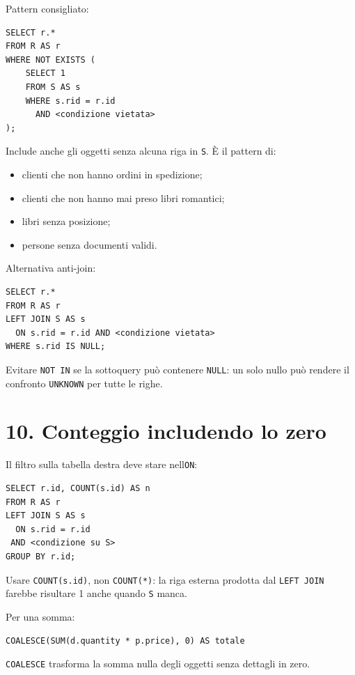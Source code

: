 \documentclass[
  10pt,
  a4paper,
]{article}
\providecommand{\tightlist}{%
  \setlength{\itemsep}{0pt}\setlength{\parskip}{0pt}}
\begin{document}
Pattern consigliato:

\begin{verbatim}
SELECT r.*
FROM R AS r
WHERE NOT EXISTS (
    SELECT 1
    FROM S AS s
    WHERE s.rid = r.id
      AND <condizione vietata>
);
\end{verbatim}

Include anche gli oggetti senza alcuna riga in \texttt{S}. È il pattern
di:

\begin{itemize}
\tightlist
\item
  clienti che non hanno ordini in spedizione;
\item
  clienti che non hanno mai preso libri romantici;
\item
  libri senza posizione;
\item
  persone senza documenti validi.
\end{itemize}

Alternativa anti-join:

\begin{verbatim}
SELECT r.*
FROM R AS r
LEFT JOIN S AS s
  ON s.rid = r.id AND <condizione vietata>
WHERE s.rid IS NULL;
\end{verbatim}

Evitare \texttt{NOT\ IN} se la sottoquery può contenere \texttt{NULL}:
un solo nullo può rendere il confronto \texttt{UNKNOWN} per tutte le
righe.

\section{10. Conteggio includendo lo
zero}\label{10-conteggio-includendo-lo-zero}

Il filtro sulla tabella destra deve stare
nell\textquotesingle{}\texttt{ON}:

\begin{verbatim}
SELECT r.id, COUNT(s.id) AS n
FROM R AS r
LEFT JOIN S AS s
  ON s.rid = r.id
 AND <condizione su S>
GROUP BY r.id;
\end{verbatim}

Usare \texttt{COUNT(s.id)}, non \texttt{COUNT(*)}: la riga esterna
prodotta dal \texttt{LEFT\ JOIN} farebbe risultare 1 anche quando
\texttt{S} manca.

Per una somma:

\begin{verbatim}
COALESCE(SUM(d.quantity * p.price), 0) AS totale
\end{verbatim}

\texttt{COALESCE} trasforma la somma nulla degli oggetti senza dettagli
in zero.
\end{document}
